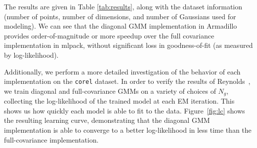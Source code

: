 The results are given in Table \ref{tab:results}, along with the dataset
information (number of points, number of dimensions, and number of Gaussians
used for modeling).  We can see that the diagonal GMM implementation in
Armadillo provides order-of-magnitude or more speedup over the full covariance
implementation in mlpack, without significant loss in goodness-of-fit (as
measured by log-likelihood).

Additionally, we perform a more detailed investigation of the behavior of each
implementation on the {\tt corel} dataset.  In order to verify the results of
Reynolds~\cite{Reynolds_2000}, we train diagonal and full-covariance GMMs on a
variety of choices of $N_g$, collecting the log-likelihood of the trained model
at each EM iteration.  This shows us how quickly each model is able to fit to
the data.  Figure~\ref{fig:lc} shows the resulting learning curve, demonstrating
that the diagonal GMM implementation is able to converge to a better
log-likelihood in less time than the full-covariance implementation.

\begin{figure*}
\begin{center}
\end{center}
\caption{GMM training time vs. log-likelihood of model for diagonal GMMs (blue)
and non-diagonal GMMs (red).  The simulation is performed for many values of
$N_g$, showing that for the {\tt corel} dataset, we can get a faster and better
fit with our implementation of diagonal GMMs than with a full-covariance GMM,
even when the diagonal GMM must have a greater $N_g$ to achieve a better fit.}
\label{fig:lc}
\end{figure*}
